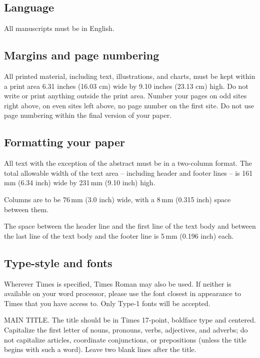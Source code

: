 \documentclass{egpubl-eurovis-short}
\begin{document}
\subsection{Language}

All manuscripts must be in English.

\subsection{Margins and page numbering}

All printed material, including text, illustrations, and charts,
must be kept within a print area 6.31 inches (16.03 cm) wide by
9.10 inches (23.13 cm) high. Do not write or print anything
outside the print area. Number your pages on odd sites right
above, on even sites left above, no page number on the first site.
Do not use page numbering within the final version of your paper.


\subsection{Formatting your paper}

All text with the exception of the abstract must be in a two-column format.
The total allowable width of the text area -- including header and footer
lines -- is 161\,mm (6.34 inch) wide by 231\,mm (9.10 inch) high.

Columns are to be 76\,mm (3.0 inch) wide, with a 8\,mm (0.315 inch) space 
between them.

The space between the header line and the first line of the text body and
between the last line of the text body and the footer line is 5\,mm
(0.196 inch) each.

\subsection{Type-style and fonts}

Wherever Times is specified, Times Roman may also be used. If
neither is available on your word processor, please use the font
closest in appearance to Times that you have access to. Only
Type-1 fonts will be accepted.

MAIN TITLE. The title should be in Times 17-point, boldface type and
centered. Capitalize the first letter of nouns, pronouns, verbs, adjectives,
and adverbs; do not capitalize articles, coordinate conjunctions, or
prepositions (unless the title begins with such a word). Leave two blank
lines after the title.
\end{document}
